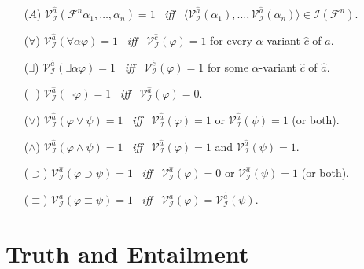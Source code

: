 \documentclass[a4paper, 11pt]{article} %
\newcommand{\tuple}[1]{\langle#1\rangle} %
\newcommand{\I}{\mathcal{I}}
\newcommand{\F}{\mathcal{F}}
\newcommand{\VV}[2]{\mathcal{V}_{#1}^{#2}} %
\begin{document}
\begin{enumerate}
  \item[($A$)] $\VV{\I}{\hat{a}}(\F^n\alpha_1,\ldots,\alpha_n)=1$ ~\textit{iff}~ $\tuple{\VV{\I}{\hat{a}}{(\alpha_1)},\ldots,\VV{\I}{\hat{a}}{(\alpha_n)}}\in\I(\F^n)$.
  \item[(\hspace{1pt}$\forall$\hspace{1pt})] $\VV{\I}{\hat{a}}(\forall\alpha\varphi)=1$ ~\textit{iff}~ $\VV{\I}{\hat{c}}(\varphi)=1$ for every $\alpha$-variant $\hat{c}$ of $\hat{a}$.
  \item[(\hspace{1pt}$\exists$\hspace{1pt})] $\VV{\I}{\hat{a}}(\exists\alpha\varphi)=1$ ~\textit{iff}~ $\VV{\I}{\hat{c}}(\varphi)=1$ for some $\alpha$-variant $\hat{c}$ of $\hat{a}$.
  \item[($\neg$)] $\VV{\I}{\hat{a}}(\neg\varphi)=1$ ~\textit{iff}~ $\VV{\I}{\hat{a}}(\varphi)=0$.
  \item[($\vee$)] $\VV{\I}{\hat{a}}(\varphi \vee \psi)=1$ ~\textit{iff}~ $\VV{\I}{\hat{a}}(\varphi)=1$ or $\VV{\I}{\hat{a}}(\psi)=1$ (or both).
  \item[($\wedge$)] $\VV{\I}{\hat{a}}(\varphi \wedge \psi)=1$ ~\textit{iff}~ $\VV{\I}{\hat{a}}(\varphi)=1$ and $\VV{\I}{\hat{a}}(\psi)=1$.
  \item[($\supset$)] $\VV{\I}{\hat{a}}(\varphi \supset \psi)=1$ ~\textit{iff}~ $\VV{\I}{\hat{a}}(\varphi)=0$ or $\VV{\I}{\hat{a}}(\psi)=1$ (or both).
  \item[($\equiv$)] $\VV{\I}{\hat{a}}(\varphi \equiv \psi)=1$ ~\textit{iff}~ $\VV{\I}{\hat{a}}(\varphi)=\VV{\I}{\hat{a}}(\psi)$.
\end{enumerate}



\section*{Truth and Entailment}
\end{document}
